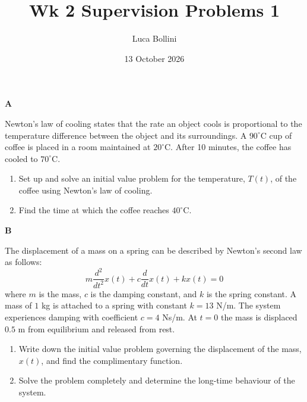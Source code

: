 \documentclass{article}
\title{Wk 2 Supervision Problems 1}
\author{Luca Bollini}
\date{13 October 2026}
\newcommand{\ddt}[1]{\frac{d}{d#1}}
\newcommand{\ddttwo}[1]{\frac{d^2}{d#1^2}}
\begin{document}
\maketitle

\begin{center}
\huge{\textbf{A}} 
\end{center}

Newton's law of cooling states that the rate an object cools is proportional to the temperature difference between the object and its surroundings.
A $90^\circ$C cup of coffee is placed in a room maintained at $20^\circ$C. After 10 minutes, the coffee has cooled to $70^\circ$C.

\begin{enumerate}
    \item Set up and solve an initial value problem for the temperature, $T(t)$, of the coffee using Newton's law of cooling.
    \item Find the time at which the coffee reaches $40^\circ$C.
\end{enumerate}

\vspace{5pt}

\begin{center}
\huge{\textbf{B}}
\end{center}

The displacement of a mass on a spring can be described by Newton's second law as follows:
\[
m\ddttwo{t}x(t) + c\ddt{t}x(t) + kx(t) = 0
\]
where $m$ is the mass, $c$ is the damping constant, and $k$ is the spring constant.
A mass of $1$ kg is attached to a spring with constant $k=13$ N/m. The system experiences damping with coefficient $c=4$ Ns/m. At $t=0$ the mass is displaced $0.5$ m from equilibrium and released from rest.

\begin{enumerate}
    \item Write down the initial value problem governing the displacement of the mass, $x(t)$, and find the complimentary function.
    \item Solve the problem completely and determine the long-time behaviour of the system.
\end{enumerate}
\end{document}
